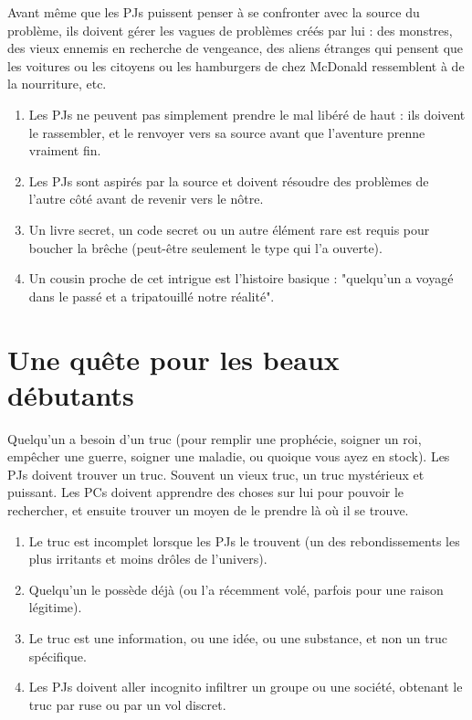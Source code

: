 \begin{multicols}{2}
Avant même que les PJs puissent penser à se confronter avec la source du problème, ils doivent gérer les vagues de problèmes créés par lui : des monstres, des vieux ennemis en recherche de vengeance, des aliens étranges qui pensent que les voitures ou les citoyens ou les hamburgers de chez McDonald ressemblent à de la nourriture, etc.

\themes
\begin{enumerate}
\item Les PJs ne peuvent pas simplement prendre le mal libéré de haut : ils doivent le rassembler, et le renvoyer vers sa source avant que l'aventure prenne vraiment fin.
\item Les PJs sont aspirés par la source et doivent résoudre des problèmes de l'autre côté avant de revenir vers le nôtre.
\item Un livre secret, un code secret ou un autre élément rare est requis pour boucher la brêche (peut-être seulement le type qui l'a ouverte).
\item Un cousin proche de cet intrigue est l'histoire basique : "quelqu'un a voyagé dans le passé et a tripatouillé notre réalité".
\end{enumerate}

\section{Une quête pour les beaux débutants}
\hypertarget{debutant}{}


Quelqu'un a besoin d'un truc (pour remplir une prophécie, soigner un roi, empêcher une guerre, soigner une maladie, ou quoique vous ayez en stock). Les PJs doivent trouver un truc. Souvent un vieux truc, un truc mystérieux et puissant. Les PCs doivent apprendre des choses sur lui pour pouvoir le rechercher, et ensuite trouver un moyen de le prendre là où il se trouve.

\themes
\begin{enumerate}
\item Le truc est incomplet lorsque les PJs le trouvent (un des rebondissements les plus irritants et moins drôles de l'univers).
\item Quelqu'un le possède déjà (ou l'a récemment volé, parfois pour une raison légitime).
\item Le truc est une information, ou une idée, ou une substance, et non un truc spécifique.
\item Les PJs doivent aller incognito infiltrer un groupe ou une société, obtenant le truc par ruse ou par un vol discret.
\end{enumerate}


\end{multicols}
